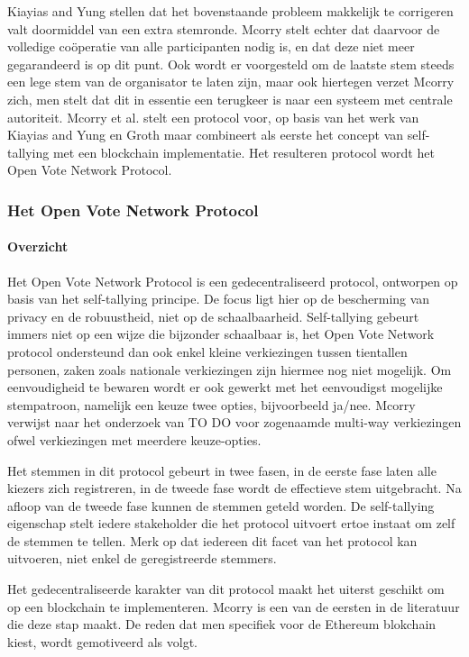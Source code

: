 		Kiayias and Yung  stellen dat het bovenstaande probleem makkelijk te corrigeren valt doormiddel van een extra stemronde. Mcorry stelt echter dat daarvoor de volledige coöperatie van alle participanten nodig is, en dat deze niet meer gegarandeerd is op dit punt. Ook wordt er voorgesteld om de laatste stem steeds een lege stem van de organisator te laten zijn, maar ook hiertegen verzet Mcorry zich, men stelt dat dit in essentie een terugkeer is naar een systeem met centrale autoriteit.  Mcorry et al. stelt een protocol voor, op basis van het werk van Kiayias and Yung en Groth maar combineert als eerste het concept van self-tallying met een blockchain implementatie. Het resulteren protocol wordt het Open Vote Network Protocol.
	
		\subsubsection{Het Open Vote Network Protocol}
			\paragraph*{Overzicht }
			Het Open Vote Network Protocol is een gedecentraliseerd protocol, ontworpen op basis van het self-tallying principe. De focus ligt hier op de bescherming van privacy en de robuustheid, niet op de schaalbaarheid. Self-tallying gebeurt immers niet op een wijze die bijzonder schaalbaar is, het  Open Vote Network protocol ondersteund dan ook enkel kleine verkiezingen tussen tientallen personen, zaken zoals nationale verkiezingen zijn hiermee nog niet mogelijk. Om eenvoudigheid te bewaren wordt er ook gewerkt met het eenvoudigst mogelijke stempatroon, namelijk een keuze twee opties, bijvoorbeeld ja/nee.  Mcorry verwijst naar het onderzoek van TO DO voor zogenaamde multi-way verkiezingen ofwel verkiezingen met meerdere keuze-opties.
			
			Het stemmen in dit protocol gebeurt in twee fasen, in de eerste fase laten alle kiezers zich registreren, in de tweede fase wordt de effectieve stem uitgebracht. Na afloop van de tweede fase kunnen de stemmen geteld worden.  De self-tallying eigenschap stelt iedere stakeholder die het protocol uitvoert ertoe instaat om zelf de stemmen te tellen. Merk op dat iedereen dit facet van het protocol kan uitvoeren, niet enkel de geregistreerde stemmers.
			 
			Het gedecentraliseerde karakter van dit protocol maakt het uiterst geschikt om op een blockchain te implementeren. Mcorry is een van de eersten in de literatuur die deze stap maakt. De reden dat men specifiek voor de Ethereum blokchain kiest, wordt gemotiveerd als volgt.
			
